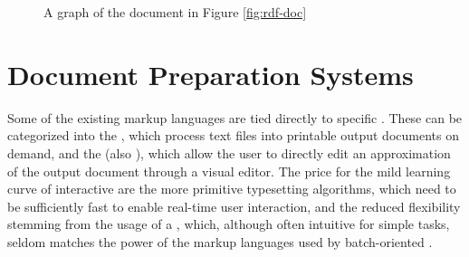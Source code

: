 \begin{figure}
\end{figure}

\begin{figure}
  
  \caption{A graph of the  document in Figure \ref{fig:rdf-doc}}
\end{figure}

        
\section{Document Preparation Systems}
Some of the existing markup languages are tied directly to specific
. These  can be categorized into the
, which process text files
into printable output documents on demand, and the
 (also ), which
allow the user to directly edit an approximation of the output document through
a visual editor. The price for the mild learning curve of interactive
 are the more primitive typesetting algorithms, which need to be
sufficiently fast to enable real-time user interaction, and the reduced
flexibility stemming from the usage of a , which, although often
intuitive for simple tasks, seldom matches the power of the markup languages
used by batch-oriented .

